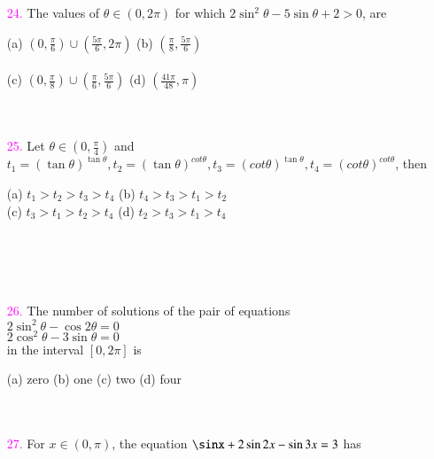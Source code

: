 \documentclass[journal,12pt,twocolumn,article]{IEEEtran}
\theoremstyle{remark}
\begin{document}
\begin{enumerate}
\begin{flushright}
    \textcolor{magenta}{}
\end{flushright}
(a) 0 \quad
(b) 1 \quad
(c) 2 \quad
(d) 4 \\\\\\
\item[\textcolor{magenta}{24.}] The values of $\theta \in (0,2\pi)$ for which $2\sin^2\theta - 5\sin\theta + 2 > 0$, are
\begin{flushright}
    \textcolor{magenta}{}
\end{flushright}
(a) $(0,\frac{\pi}{6})\cup(\frac{5\pi}{6},2\pi)$\quad
(b) $(\frac{\pi}{8},\frac{5\pi}{6})$\\\\
(c) $(0,\frac{\pi}{8})\cup(\frac{\pi}{6},\frac{5\pi}{6})$\quad
(d) $(\frac{41\pi}{48},\pi)$\\\\\\
\item[\textcolor{magenta}{25.}] Let $\theta \in (0,\frac{\pi}{4})$ and $t_1 = (\tan\theta)^{\tan\theta}, t_2 = (\tan\theta)^{cot\theta},t_3 = (cot\theta)^{\tan\theta}, t_4 = (cot\theta)^{cot\theta}$, then
\begin{flushright}
    \textcolor{magenta}{}
\end{flushright}
(a) $t_1>t_2>t_3>t_4$\quad
(b) $t_4>t_3>t_1>t_2$\\
(c) $t_3>t_1>t_2>t_4$\quad
(d) $t_2>t_3>t_1>t_4$\\\\\\\\\\
\item[\textcolor{magenta}{26.}] The number of solutions of the pair of equations\\
$2\sin^2\theta - \cos2\theta = 0$\\
$2\cos^2\theta - 3\sin\theta = 0$\\
in the interval $[0,2\pi]$ is
\begin{flushright}
    \textcolor{magenta}{}
\end{flushright}
(a) zero\quad
(b) one\quad
(c) two\quad
(d) four\\\\\\
\item[\textcolor{magenta}{27.}] For $x \in (0,\pi)$, the equation $\sinx + 2\sin2x - \sin3x = 3$ has

\end{enumerate}
\end{document}
